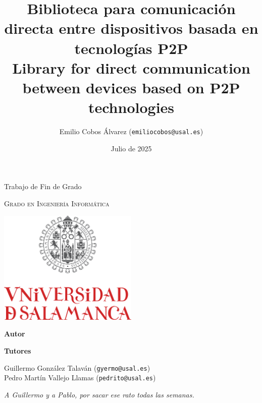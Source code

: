 \documentclass[12pt,a4paper]{report}
\title{
  \textbf{Biblioteca para comunicación directa entre dispositivos basada en tecnologías P2P} \\
  \vspace{\parskip}
  \small Library for direct communication between devices based on P2P technologies
}
\author{
  Emilio Cobos Álvarez (\texttt{emiliocobos@usal.es})
}
\date{Julio de 2025}
\begin{document}
 


\begin{titlepage}
\begin{center}
  {\Large \thetitle}

  \vspace*{\fill}

  {\large Trabajo de Fin de Grado}

  \textsc{Grado en Ingeniería Informática}

  \vspace{2em}

  \includegraphics[width=0.5\textwidth]{res/usal-logo.pdf}

  \vspace{2em}

  \thedate

  \vspace*{\fill}

  {\large \textbf{Autor}}

  \theauthor

  \vspace{\parskip}

  {\large \textbf{Tutores}}

  Guillermo González Talaván (\texttt{gyermo@usal.es}) \\ Pedro Martín Vallejo Llamas (\texttt{pedrito@usal.es})
\end{center}
\end{titlepage}



\clearpage



\clearpage

\printglossaries

\clearpage

\begin{flushright}
  \emph{A Guillermo y a Pablo, por sacar ese rato todas las semanas.}
\end{flushright}

\clearpage

\tableofcontents

\clearpage

















\end{document}
